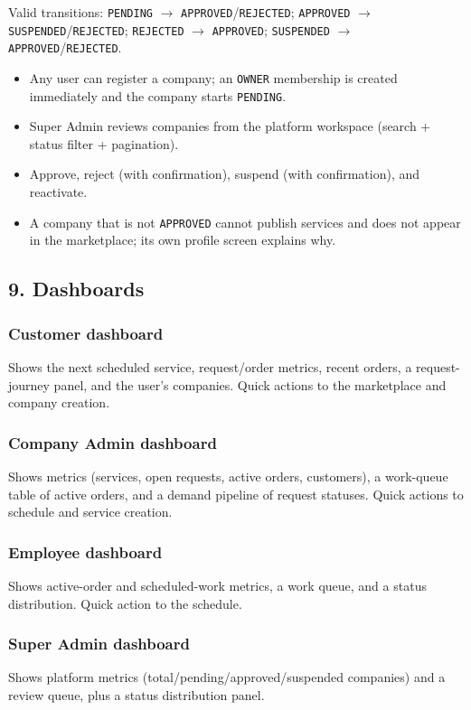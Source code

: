 \documentclass[11pt,a4paper]{article}
\begin{document}
Valid transitions: \texttt{PENDING} $\rightarrow$ \texttt{APPROVED}/\texttt{REJECTED}; \texttt{APPROVED} $\rightarrow$ \texttt{SUSPENDED}/\texttt{REJECTED}; \texttt{REJECTED} $\rightarrow$ \texttt{APPROVED}; \texttt{SUSPENDED} $\rightarrow$ \texttt{APPROVED}/\texttt{REJECTED}.

\begin{itemize}[leftmargin=2em, itemsep=2pt]
  \item Any user can register a company; an \texttt{OWNER} membership is created immediately and the company starts \texttt{PENDING}.
  \item Super Admin reviews companies from the platform workspace (search + status filter + pagination).
  \item Approve, reject (with confirmation), suspend (with confirmation), and reactivate.
  \item A company that is not \texttt{APPROVED} cannot publish services and does not appear in the marketplace; its own profile screen explains why.
\end{itemize}

\subsection{9. Dashboards}
\label{sec:dashboards}

\subsubsection{Customer dashboard}
Shows the next scheduled service, request/order metrics, recent orders, a request-journey panel, and the user's companies. Quick actions to the marketplace and company creation.

\subsubsection{Company Admin dashboard}
Shows metrics (services, open requests, active orders, customers), a work-queue table of active orders, and a demand pipeline of request statuses. Quick actions to schedule and service creation.

\subsubsection{Employee dashboard}
Shows active-order and scheduled-work metrics, a work queue, and a status distribution. Quick action to the schedule.

\subsubsection{Super Admin dashboard}
Shows platform metrics (total/pending/approved/suspended companies) and a review queue, plus a status distribution panel.
\end{document}

